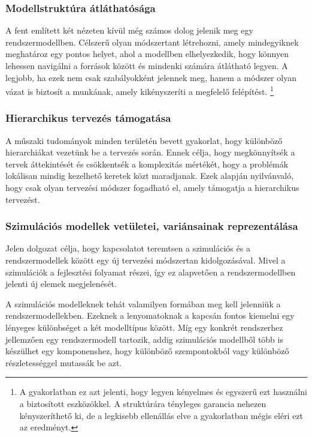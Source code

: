         \subsubsection{Modellstruktúra átláthatósága}
        A fent említett két nézeten kívül még számos dolog jelenik meg egy rendszermodellben.
        Célszerű olyan módszertant létrehozni, amely mindegyiknek meghatároz egy pontos helyet, ahol a modellben elhelyezkedik, hogy könnyen lehessen navigálni a források között és mindenki számára átlátható legyen.
        A legjobb, ha ezek nem csak szabályokként jelennek meg, hanem a módszer olyan vázat is biztosít a munkának, amely kikényszeríti a megfelelő felépítést.
        \footnote{A gyakorlatban ez azt jelenti, hogy legyen kényelmes és egyszerű ezt használni a biztosított eszközökkel. A struktúrára tényleges garancia nehezen kényszeríthető ki, de a legkisebb ellenállás elve a gyakorlatban mégis eléri ezt az eredményt.}

        \subsubsection{Hierarchikus tervezés támogatása} \label{sec:Hierarhia}
        A műszaki tudományok minden területén bevett gyakorlat, hogy különböző hierarchiákat vezetünk be a tervezés során.
        Ennek célja, hogy megkönnyítsék a tervek áttekintését és csökkentsék a komplexitás mértékét, hogy a problémák lokálisan mindig kezelhető keretek közt maradjanak.
        Ezek alapján nyilvánvaló, hogy csak olyan tervezési módszer fogadható el, amely támogatja a hierarchikus tervezést.

        \subsubsection{Szimulációs modellek vetületei, variánsainak reprezentálása} \label{sec:SzimIntKov}
        Jelen dolgozat célja, hogy kapcsolatot teremtsen a szimulációs és a rendszermodellek között egy új tervezési módszertan kidolgozásával.
        Mivel a szimulációk a fejlesztési folyamat részei, így ez alapvetően a rendszermodellben jelenti új elemek megjelenését.
        
        A szimulációs modelleknek tehát valamilyen formában meg kell jelenniük a rendszermodellekben.
        Ezeknek a lenyomatoknak a kapcsán fontos kiemelni egy lényeges különbséget a két modelltípus között.
        Míg egy konkrét rendszerhez jellemzően egy rendszermodell tartozik, addig szimulációs modellből több is készülhet egy komponenshez, hogy különböző szempontokból vagy különböző részletességgel mutassák be azt.
        
